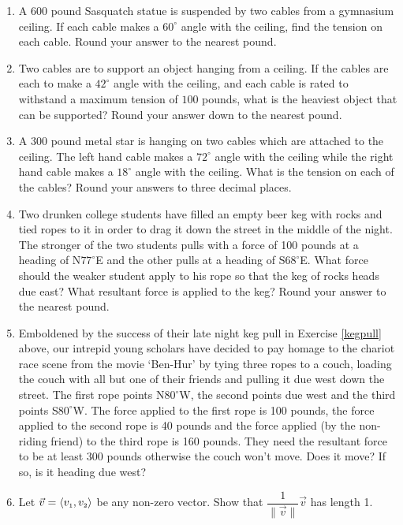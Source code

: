\begin{enumerate}
\item  A $600$ pound Sasquatch statue is suspended by two cables from a gymnasium ceiling.  If  each cable makes a $60^{\circ}$ angle with the ceiling, find the tension on each cable.  Round your answer to the nearest pound.

\item  Two cables are to support an object hanging from a ceiling.  If the cables are each to make a $42^{\circ}$ angle with the ceiling, and each cable is rated to withstand a maximum tension of $100$ pounds, what is the heaviest object that can be supported?  Round your answer down to the nearest pound.

\item A $300$ pound metal star is hanging on two cables which are attached to the ceiling.  The left hand cable makes a $72^{\circ}$ angle with the ceiling while the right hand cable makes a $18^{\circ}$ angle with the ceiling.  What is the tension on each of the cables?  Round your answers to three decimal places.

\item Two drunken college students have filled an empty beer keg with rocks and tied ropes to it in order to drag it down the street in the middle of the night.  The stronger of the two students pulls with a force of 100 pounds at a heading of N$77^{\circ}$E and the other pulls at a heading of S$68^{\circ}$E.  What force should the weaker student apply to his rope so that the keg of rocks heads due east?  What resultant force is applied to the keg?  Round your answer to the nearest pound.
\label{kegpull}

\item Emboldened by the success of their late night keg pull in Exercise \ref{kegpull} above, our intrepid young scholars have decided to pay homage to the chariot race scene from the movie `Ben-Hur' by tying three ropes to a couch, loading the couch with all but one of their friends and pulling it due west down the street. The first rope points N$80^{\circ}$W, the second points due west and the third points S$80^{\circ}$W.  The force applied to the first rope is 100 pounds, the force applied to the second rope is 40 pounds and the force applied (by the non-riding friend) to the third rope is 160 pounds.  They need the resultant force to be at least 300 pounds otherwise the couch won't move.  Does it move?  If so, is it heading due west?

\item Let $\vec{v} = \langle v_{\text{\tiny $1$}}, v_{\text{\tiny $2$}} \rangle$ be any non-zero vector. Show that $\dfrac{1}{\|\vec{v}\|} \vec{v}$ has length 1.


\end{enumerate}
